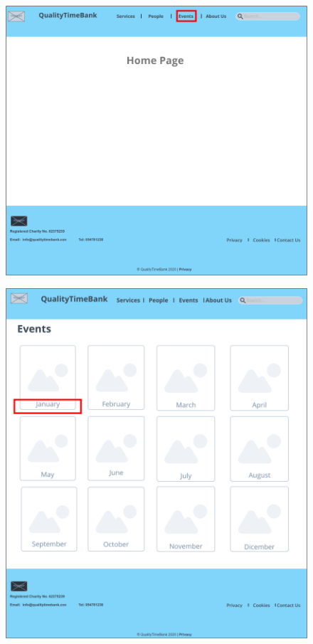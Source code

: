 \documentclass[a4paper, 11pt, parskip=half, headsepline]{scrreprt}
\begin{document}
\begin{figure}[H]
	\centering
	\includegraphics[width=1\linewidth, keepaspectratio]{scenarios/scenario-21}
	\caption{}
	\label{fig:scenario-21}
\end{figure}

\begin{figure}[H]
	\centering
	\includegraphics[width=1\linewidth, keepaspectratio]{scenarios/scenario-22}
	\caption{}
	\label{fig:scenario-22}
\end{figure}
\end{document}
